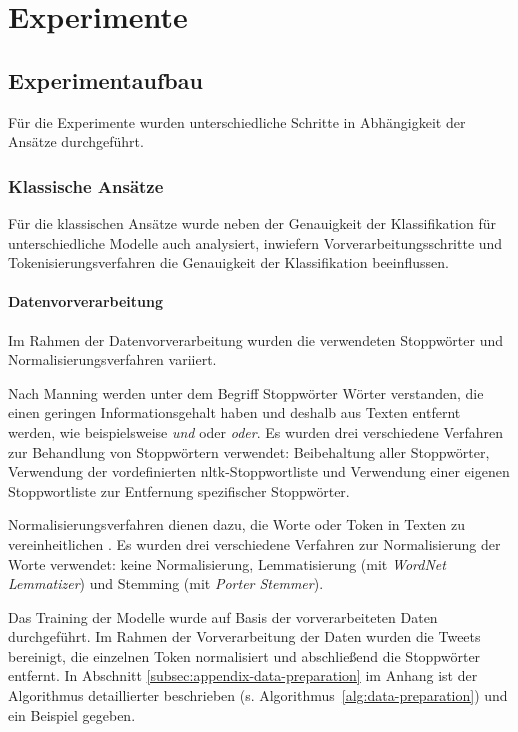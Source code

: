 \section{Experimente}

\subsection{Experimentaufbau}

Für die Experimente wurden unterschiedliche Schritte in Abhängigkeit der Ansätze durch\-ge\-führt.

\subsubsection{Klassische Ansätze}\label{subsubsec:experimente-klassische-ansaetze}

Für die klassischen Ansätze wurde neben der Genauigkeit der Klassifikation für unterschiedliche Modelle auch analysiert, inwiefern Vorverarbeitungsschritte und Tokeni\-sie\-rungs\-verfahren die Genauigkeit der Klassifikation beeinflussen.

\paragraph{Datenvorverarbeitung}
Im Rahmen der Datenvorverarbeitung wurden die verwendeten Stoppwörter und Normalisierungsverfahren variiert.

Nach Manning \cite[S.27]{manning2009introduction} werden unter dem Begriff Stoppwörter Wörter verstanden, die einen geringen Informationsgehalt haben und deshalb aus Texten entfernt werden, wie beispielsweise \textit{und} oder \textit{oder}.
Es wurden drei verschiedene Verfahren zur Behandlung von Stoppwörtern verwendet: Beibehaltung aller Stoppwörter, Verwendung der vordefinierten \gls{nltk}-Stoppwortliste und Verwendung einer eigenen Stoppwortliste zur Entfernung spezifischer Stoppwörter.

Normalisierungsverfahren dienen dazu, die Worte oder Token in Texten zu vereinheitlichen \cite[S.28]{manning2009introduction}.
Es wurden drei verschiedene Verfahren zur Normalisierung der Worte verwendet: keine Normalisierung, Lemmatisierung (mit \textit{WordNet Lemmatizer}) und Stemming (mit \textit{Porter Stemmer}).

Das Training der Modelle wurde auf Basis der vorverarbeiteten Daten durchgeführt.
Im Rahmen der Vorverarbeitung der Daten wurden die Tweets bereinigt, die einzelnen Token normalisiert und abschließend die Stoppwörter entfernt.
In Abschnitt \ref{subsec:appendix-data-preparation} im Anhang ist der Algorithmus detaillierter beschrieben (s. Algorithmus~\ref{alg:data-preparation}) und ein Beispiel gegeben.


